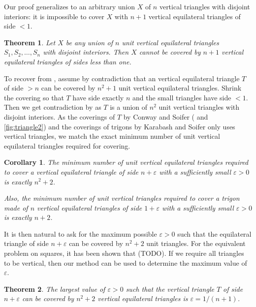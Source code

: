 \documentclass[a4paper]{amsart}
\theoremstyle{plain}
\newtheorem{theorem}{Theorem}
\newtheorem{corollary}{Corollary}
\theoremstyle{definition}
\begin{document}
Our proof generalizes to an arbitrary union \(X\) of \(n\) vertical triangles with disjoint interiors: it is impossible to cover \(X\) with \(n + 1\) vertical equilateral triangles of side \(< 1\).

\begin{theorem}

Let \(X\) be any union of \(n\) unit vertical equilateral triangles \(S_1, S_2, \dots, S_n\) with disjoint interiors. Then \(X\) cannot be covered by \(n + 1\) vertical equilateral triangles of sides less than one.

\label{thm:triangle-cover}
\end{theorem}

To recover  from , assume by contradiction that an vertical equilateral triangle \(T\) of side \(> n\) can be covered by \(n^2 + 1\) unit vertical equilateral triangles. Shrink the covering so that \(T\) have side exactly \(n\) and the small triangles have side \(< 1\). Then we get contradiction by  as \(T\) is a union of \(n^2\) unit vertical triangles with disjoint interiors.
As the coverings of \(T\) by Conway and Soifer ( and \ref{fig:triangle2}) and the coverings of trigons by Karabash and Soifer only uses vertical triangles,
we match the exact minimum number of unit vertical equilateral triangles required for covering.

\begin{corollary}
The minimum number of unit vertical equilateral triangles required to cover a vertical equilateral triangle of side \(n + \varepsilon\) with a sufficiently small $\varepsilon > 0$ is exactly \(n^2+2\).

Also, the minimum number of unit vertical triangles required to cover a trigon made of \(n\) vertical equilateral triangles of side \(1 + \varepsilon\) with a sufficiently small $\varepsilon > 0$ is exactly \(n + 2\).

\label{cor:triangle-cover-number}
\end{corollary}

It is then natural to ask for the maximum possible $\varepsilon > 0$ such that the equilateral triangle of side $n + \varepsilon$ can be covered by $n^2+2$ unit triangles.
For the equivalent problem on squares, it has been shown that (TODO).
If we require all triangles to be vertical, then our method can be used to determine the maximum value of $\varepsilon$.

\begin{theorem}
The largest value of $\varepsilon > 0$ such that the vertical triangle $T$ of side $n + \varepsilon$ can be covered by $n^2+2$ vertical equilateral triangles is $\varepsilon = 1/(n+1)$.
\label{thm:max-epsilon}
\end{theorem}
\end{document}
